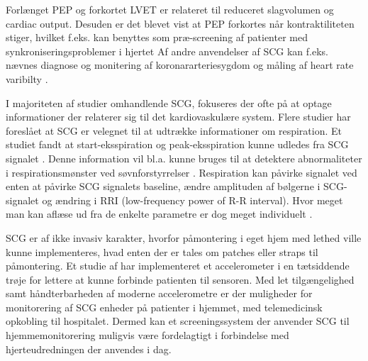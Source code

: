 Forlænget PEP og forkortet LVET er relateret til reduceret slagvolumen og cardiac output. Desuden er det blevet vist at PEP forkortes når kontraktiliteten stiger, hvilket f.eks. kan benyttes som præ-screening af patienter med synkroniseringsproblemer i hjertet   Af andre anvendelser af SCG kan f.eks. nævnes diagnose og monitering af koronararteriesygdom og måling af heart rate varibilty \cite{zanetti}  \cite{abra}.

I majoriteten af studier omhandlende SCG, fokuseres der ofte på at optage informationer der relaterer sig til det kardiovaskulære system. Flere studier har foreslået at SCG er velegnet til at udtrække informationer om respiration. Et studiet fandt at start-eksspiration og peak-eksspiration kunne udledes fra SCG signalet \cite{pandia} \cite{magic}. Denne information vil  bl.a. kunne bruges til at detektere abnormaliteter i respirationsmønster ved søvnforstyrrelser \cite{tavaloka}. Respiration kan påvirke signalet ved enten at påvirke SCG signalets baseline, ændre amplituden af bølgerne i SCG-signalet og ændring i RRI (low-frequency power of R-R interval). Hvor meget man kan aflæse ud fra de enkelte parametre er dog meget individuelt \cite{magic}.

 SCG er af ikke invasiv karakter, hvorfor påmontering i eget hjem med lethed ville kunne implementeres, hvad enten der er tales om patches eller straps til påmontering. Et studie af \cite{Wearable} har implementeret et accelerometer i en tætsiddende trøje for lettere at kunne forbinde patienten til sensoren. Med let tilgængelighed samt håndterbarheden af moderne accelerometre  er der muligheder for monitorering af SCG enheder på patienter i hjemmet, med telemedicinsk opkobling til hospitalet. Dermed kan et screeningssystem der anvender SCG til hjemmemonitorering muligvis være fordelagtigt i forbindelse med hjerteudredningen der anvendes i dag.
